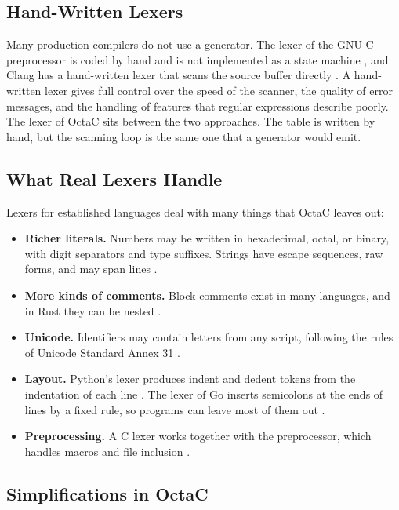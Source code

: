 \subsection{Hand-Written Lexers}

Many production compilers do not use a generator. The lexer of the GNU C
preprocessor is coded by hand and is not implemented as a state machine
\cite{gcc-cppinternals}, and Clang has a hand-written lexer that scans the
source buffer directly \cite{clang-internals}. A hand-written lexer gives full
control over the speed of the scanner, the quality of error messages, and the
handling of features that regular expressions describe poorly. The lexer of
OctaC sits between the two approaches. The table is written by hand, but the
scanning loop is the same one that a generator would emit.

\subsection{What Real Lexers Handle}

Lexers for established languages deal with many things that OctaC leaves out:

\begin{itemize}
    \item \textbf{Richer literals.} Numbers may be written in hexadecimal,
    octal, or binary, with digit separators and type suffixes. Strings have
    escape sequences, raw forms, and may span lines \cite{rust-reference}.
    \item \textbf{More kinds of comments.} Block comments exist in many
    languages, and in Rust they can be nested \cite{rust-reference}.
    \item \textbf{Unicode.} Identifiers may contain letters from any script,
    following the rules of Unicode Standard Annex 31
    \cite{unicode-uax31,python-reference}.
    \item \textbf{Layout.} Python's lexer produces indent and dedent tokens
    from the indentation of each line \cite{python-reference}. The lexer of
    Go inserts semicolons at the ends of lines by a fixed rule, so programs
    can leave most of them out \cite{go-spec}.
    \item \textbf{Preprocessing.} A C lexer works together with the
    preprocessor, which handles macros and file inclusion
    \cite{gcc-cppinternals}.
\end{itemize}

\subsection{Simplifications in OctaC}

